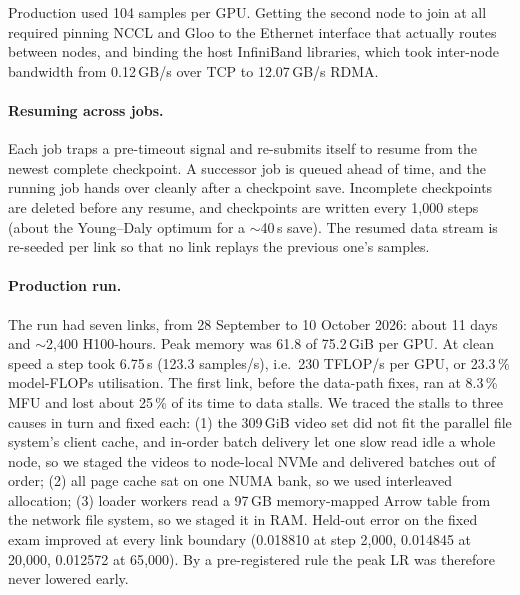 \documentclass[10pt]{article}
\begin{document}
\noindent Production used 104 samples per GPU. Getting the second node to join at all required pinning NCCL and Gloo
to the Ethernet interface that actually routes between nodes, and binding the host InfiniBand libraries, which took
inter-node bandwidth from 0.12\,GB/s over TCP to 12.07\,GB/s RDMA.

\paragraph{Resuming across jobs.} Each job traps a pre-timeout signal and re-submits itself to resume from the
newest complete checkpoint. A successor job is queued ahead of time, and the running job hands over cleanly after a
checkpoint save. Incomplete checkpoints are deleted before any resume, and checkpoints are written every 1{,}000 steps
(about the Young--Daly optimum for a $\sim$40\,s save). The resumed data stream is re-seeded per link so that no link
replays the previous one's samples.

\paragraph{Production run.} The run had seven links, from 28 September to 10 October 2026: about 11 days and
$\sim$2{,}400 H100-hours. Peak memory was 61.8 of 75.2\,GiB per GPU. At clean speed a step took 6.75\,s
(123.3 samples/s), i.e.\ 230 TFLOP/s per GPU, or 23.3\,\% model-FLOPs utilisation. The first link, before the
data-path fixes, ran at 8.3\,\% MFU and lost about 25\,\% of its time to data stalls. We traced the stalls to three
causes in turn and fixed each:
(1) the 309\,GiB video set did not fit the parallel file system's client cache, and in-order batch delivery let one
slow read idle a whole node, so we staged the videos to node-local NVMe and delivered batches out of order;
(2) all page cache sat on one NUMA bank, so we used interleaved allocation;
(3) loader workers read a 97\,GB memory-mapped Arrow table from the network file system, so we staged it in RAM.
Held-out error on the fixed exam improved at every link boundary (0.018810 at step 2{,}000, 0.014845 at 20{,}000,
0.012572 at 65{,}000). By a pre-registered rule the peak LR was therefore never lowered early.

\end{document}
